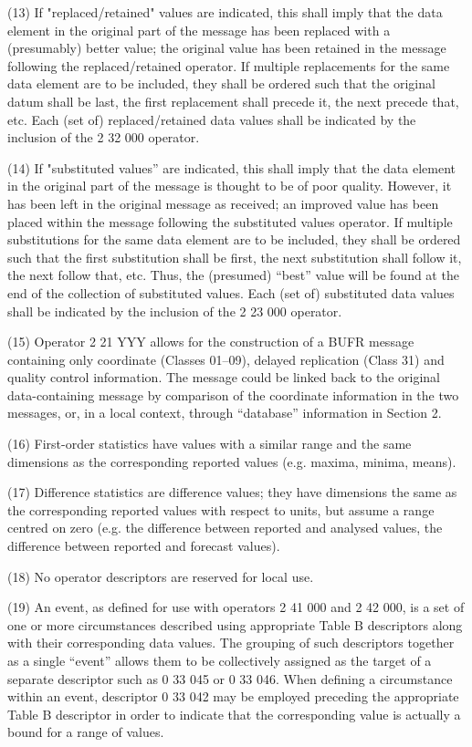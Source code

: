 (13) If "replaced/retained" values are indicated, this shall imply that the data element in the original part of the message has been replaced with a (presumably) better value; the original value has been retained in the message following the replaced/retained operator. If multiple replacements for the same data element are to be included, they shall be ordered such that the original datum shall be last, the first replacement shall precede it, the next precede that, etc. Each (set of) replaced/retained data values shall be indicated by the inclusion of the 2 32 000 operator.

(14) If "substituted values'' are indicated, this shall imply that the data element in the original part of the message is thought to be of poor quality. However, it has been left in the original message as received; an improved value has been placed within the message following the substituted values operator. If multiple substitutions for the same data element are to be included, they shall be ordered such that the first substitution shall be first, the next substitution shall follow it, the next follow that, etc. Thus, the (presumed) ``best'' value will be found at the end of the collection of substituted values. Each (set of) substituted data values shall be indicated by the inclusion of the 2 23 000 operator.

(15) Operator 2 21 YYY allows for the construction of a BUFR message containing only coordinate (Classes 01--09), delayed replication (Class 31) and quality control information. The message could be linked back to the original data-containing message by comparison of the coordinate information in the two messages, or, in a local context, through ``database'' information in Section 2.

(16) First-order statistics have values with a similar range and the same dimensions as the corresponding reported values (e.g. maxima, minima, means).

(17) Difference statistics are difference values; they have dimensions the same as the corresponding reported values with respect to units, but assume a range centred on zero (e.g. the difference between reported and analysed values, the difference between reported and forecast values).

(18) No operator descriptors are reserved for local use.

(19) An event, as defined for use with operators 2 41 000 and 2 42 000, is a set of one or more circumstances described using appropriate Table B descriptors along with their corresponding data values. The grouping of such descriptors together as a single ``event'' allows them to be collectively assigned as the target of a separate descriptor such as 0 33 045 or 0 33 046. When defining a circumstance within an event, descriptor 0 33 042 may be employed preceding the appropriate Table B descriptor in order to indicate that the corresponding value is actually a bound for a range of values.

